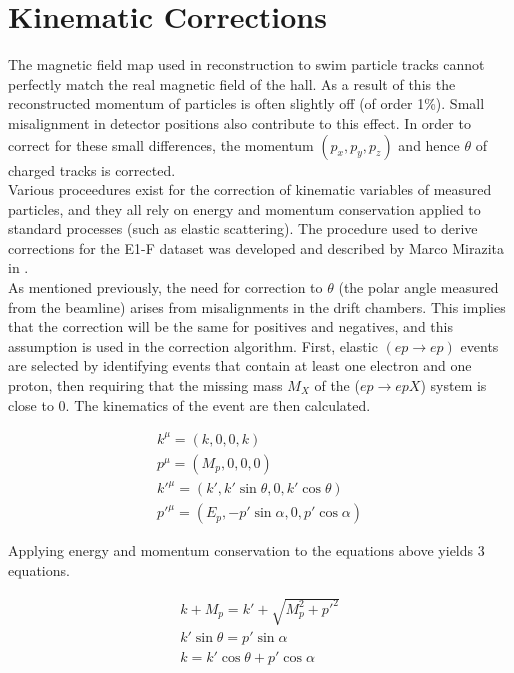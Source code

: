 \section{Kinematic Corrections}
The magnetic field map used in reconstruction to swim particle tracks cannot perfectly match the real magnetic field of the hall.  As a result of this the reconstructed momentum of particles is often slightly off (of order 1\%).  Small misalignment in detector positions also contribute to this effect.  In order to correct for these small differences, the momentum $(p_x, p_y, p_z)$ and hence $\theta$ of charged tracks is corrected. \\

Various proceedures exist for the correction of kinematic variables of measured particles, and they all rely on energy and momentum conservation applied to standard processes (such as elastic scattering).  The procedure used to derive corrections for the E1-F dataset was developed and described by Marco Mirazita in \cite{misc-mirazita:2010}.  \\

As mentioned previously, the need for correction to $\theta$ (the polar angle measured from the beamline) arises from misalignments in the drift chambers.  This implies that the correction will be the same for positives and negatives, and this assumption is used in the correction algorithm.  First, elastic $(ep \rightarrow ep)$ events are selected by identifying events that contain at least one electron and one proton, then requiring that the missing mass $M_X$ of the ($ep \rightarrow epX$) system is close to 0.  The kinematics of the event are then calculated.

\begin{gather}
	k^{\mu} = (k, 0, 0, k)                         \\
	p^{\mu} = (M_{p}, 0, 0, 0)                     \\
	k'^{\mu} = (k', k'\sin\theta, 0, k'\cos\theta) \\
	p'^{\mu} = (E_{p}, -p'\sin\alpha, 0, p'\cos\alpha) 
\end{gather}

Applying energy and momentum conservation to the equations above yields 3 equations.

\begin{gather}
	k + M_p = k' + \sqrt{M_{p}^{2} + p'^2} \\
	k'\sin\theta = p'\sin\alpha            \\
	k = k'\cos\theta + p'\cos\alpha  
\end{gather}

